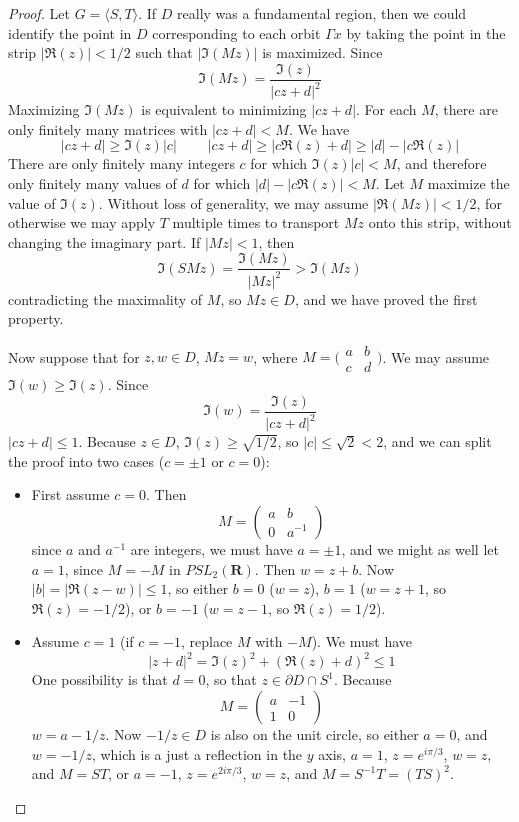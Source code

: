 \begin{proof}
    Let $G = \langle S,T \rangle$. If $D$ really was a fundamental region, then we could identify the point in $D$ corresponding to each orbit $\Gamma x$ by taking the point in the strip $|\Re(z)| < 1/2$ such that $|\Im(Mz)|$ is maximized. Since
    \[ \Im(Mz) = \frac{\Im(z)}{|cz+d|^2} \]
    Maximizing $\Im(Mz)$ is equivalent to minimizing $|cz + d|$. For each $M$, there are only finitely many matrices with $|cz + d| < M$. We have
    \[ |cz + d| \geq \Im(z) |c|\ \ \ \ \ \ \ \ \ \ |cz + d| \geq |c \Re(z) + d| \geq |d| - |c \Re(z)| \]
    There are only finitely many integers $c$ for which $\Im(z) |c| < M$, and therefore only finitely many values of $d$ for which $|d| - |c \Re(z)| < M$. Let $M$ maximize the value of $\Im(z)$. Without loss of generality, we may assume $|\Re(Mz)| < 1/2$, for otherwise we may apply $T$ multiple times to transport $Mz$ onto this strip, without changing the imaginary part. If $|Mz| < 1$, then
    \[ \Im(SMz) = \frac{\Im(Mz)}{|Mz|^2} > \Im(Mz) \]
    contradicting the maximality of $M$, so $Mz \in D$, and we have proved the first property.

    Now suppose that for $z,w \in D$, $Mz = w$, where $M = \big( \begin{smallmatrix} a & b \\ c & d \end{smallmatrix} \big)$. We may assume $\Im(w) \geq \Im(z)$. Since
    \[ \Im(w) = \frac{\Im(z)}{|cz + d|^2} \]
    $|cz + d| \leq 1$. Because $z \in D$, $\Im(z) \geq \sqrt{1/2}$, so $|c| \leq \sqrt{2} < 2$, and we can split the proof into two cases ($c = \pm 1$ or $c = 0$):

    \begin{itemize}
        \item First assume $c = 0$. Then
        \[ M = \begin{pmatrix} a & b \\ 0 & a^{-1} \end{pmatrix} \]
        since $a$ and $a^{-1}$ are integers, we must have $a = \pm 1$, and we might as well let $a = 1$, since $M = - M$ in $PSL_2(\mathbf{R})$. Then $w = z + b$. Now $|b| = |\Re(z-w)| \leq 1$, so either $b = 0$ ($w = z$), $b = 1$ ($w = z+1$, so $\Re(z) = -1/2$), or $b = -1$ ($w = z - 1$, so $\Re(z) = 1/2$).

        \item Assume $c = 1$ (if $c = -1$, replace $M$ with $-M$). We must have
        \[ |z + d|^2 = \Im(z)^2 + (\Re(z) + d)^2 \leq 1 \]
        One possibility is that $d = 0$, so that $z \in \partial D \cap S^1$. Because
        \[ M = \begin{pmatrix} a & -1 \\ 1 & 0 \end{pmatrix} \]
        $w = a - 1/z$. Now $-1/z \in D$ is also on the unit circle, so either $a = 0$, and $w = -1/z$, which is a just a reflection in the $y$ axis, $a = 1$, $z = e^{i\pi/3}$, $w = z$, and $M = ST$, or $a = -1$, $z = e^{2i\pi/3}$, $w = z$, and $M = S^{-1}T = (TS)^2$.


\end{itemize}
\end{proof}
